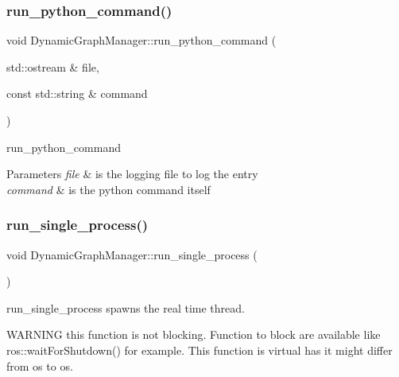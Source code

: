\subsubsection{\texorpdfstring{run\+\_\+python\+\_\+command()}{run\_python\_command()}}
{\footnotesize\ttfamily void Dynamic\+Graph\+Manager\+::run\+\_\+python\+\_\+command (\begin{DoxyParamCaption}\item[{std\+::ostream \&}]{file,  }\item[{const std\+::string \&}]{command }\end{DoxyParamCaption})}



run\+\_\+python\+\_\+command 


\begin{DoxyParams}{Parameters}
{\em file} & is the logging file to log the entry \\
\hline
{\em command} & is the python command itself \\
\hline
\end{DoxyParams}
\mbox{\label{classdynamic__graph_1_1DynamicGraphManager_ad13f5aef302173293a0c162c28505ef8}} 
\subsubsection{\texorpdfstring{run\+\_\+single\+\_\+process()}{run\_single\_process()}}
{\footnotesize\ttfamily void Dynamic\+Graph\+Manager\+::run\+\_\+single\+\_\+process (\begin{DoxyParamCaption}{ }\end{DoxyParamCaption})\hspace{0.3cm}{\ttfamily [virtual]}}



run\+\_\+single\+\_\+process spawns the real time thread. 

W\+A\+R\+N\+I\+NG this function is not blocking. Function to block are available like ros\+::wait\+For\+Shutdown() for example. This function is virtual has it might differ from os to os. \mbox{\label{classdynamic__graph_1_1DynamicGraphManager_a506e6f37ac7205efaf0efe4202cde897}} 
